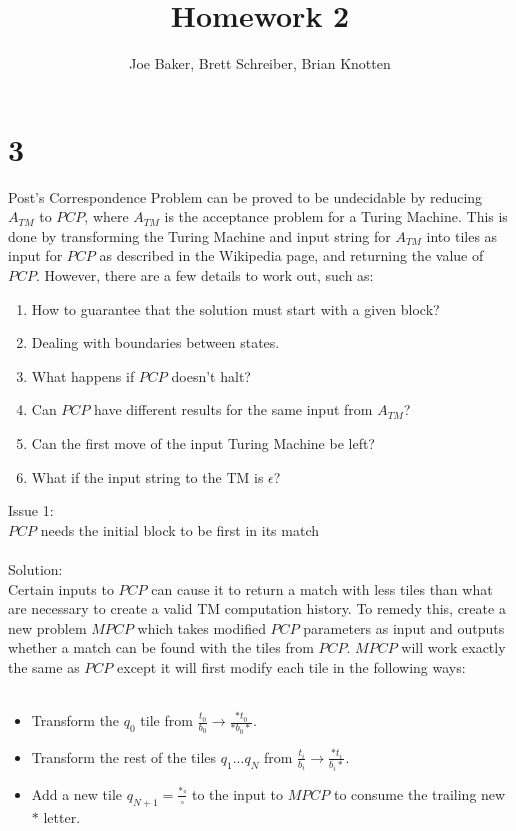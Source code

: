 \documentclass[letterpaper,notitlepage,twoside]{article}
\begin{document}
\title{Homework 2}
\author{Joe Baker, Brett Schreiber, Brian Knotten}
\maketitle


\section*{3}
Post's Correspondence Problem can be proved to be undecidable by reducing $A_{TM}$ to $PCP$, where $A_{TM}$ is the acceptance problem for a Turing Machine. This is done by transforming the Turing Machine and input string for $A_{TM}$ into tiles as input for $PCP$ as described in the Wikipedia page, and returning the value of $PCP$. However, there are a few details to work out, such as:
\begin{enumerate}
\item How to guarantee that the solution must start with a given block?
\item Dealing with boundaries between states.
\item What happens if $PCP$ doesn't halt?
\item Can $PCP$ have different results for the same input from $A_{TM}$?
\item Can the first move of the input Turing Machine be left?
\item What if the input string to the TM is $\epsilon$?
\end{enumerate}
Issue 1:\\
$PCP$ needs the initial block to be first in its match\\\\
Solution:\\
Certain inputs to $PCP$ can cause it to return a match with less tiles than what are necessary to create a valid TM computation history. To remedy this, create a new problem $MPCP$ which takes modified $PCP$ parameters as input and outputs whether a match can be found with the tiles from $PCP$. $MPCP$ will work exactly the same as $PCP$ except it will first modify each tile in the following ways:\\\\
\begin{itemize}
\item Transform the $q_0$ tile from $\frac{t_0}{b_0} \rightarrow \frac{*t_0}{*b_0*}$.
\item Transform the rest of the tiles $q_1...q_N$ from $\frac{t_i}{b_i} \rightarrow \frac{*t_i}{b_i*}$.
\item Add a new tile $q_{N+1} = \frac{*\square}{\square}$ to the input to $MPCP$ to consume the trailing new $*$ letter.
\end{itemize}
\end{document}
